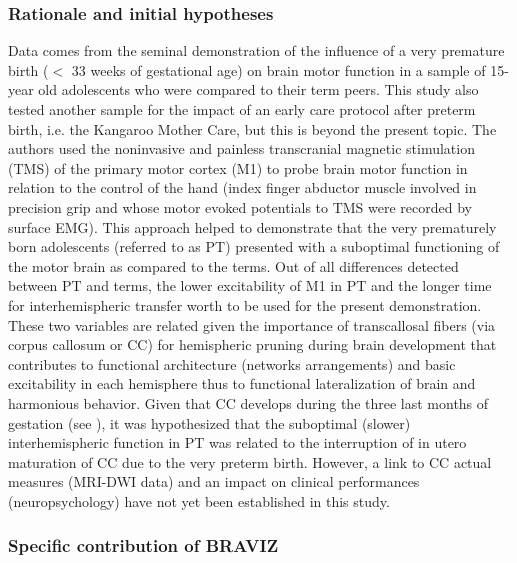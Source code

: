 \documentclass{frontiersHLTH}
\begin{document}
\subsubsection{Rationale and initial hypotheses}

Data comes from the seminal demonstration \cite{schneider_cerebral_2012} of the influence of a very premature birth ($<$ 33 weeks of gestational age) on brain motor function in a sample of 15-year old adolescents who were compared to their term peers. This study also tested another sample for the impact of an early care protocol after preterm birth, i.e. the Kangaroo Mother Care, but this is beyond the present topic. The authors used the noninvasive and painless transcranial magnetic stimulation (TMS) of the primary motor cortex (M1) to probe brain motor function in relation to the control of the hand (index finger abductor muscle involved in precision grip and whose motor evoked potentials to TMS were recorded by surface EMG). This approach helped to demonstrate that the very prematurely born adolescents (referred to as PT) presented with a suboptimal functioning of the motor brain as compared to the terms. Out of all differences detected between PT and terms, the lower excitability of M1 in PT and the longer time for interhemispheric transfer worth to be used for the present demonstration. These two variables are related given the importance of transcallosal fibers (via corpus callosum or CC) for hemispheric pruning during brain development that contributes to functional architecture (networks arrangements) and basic excitability in each hemisphere thus to functional lateralization of brain and harmonious behavior. Given that CC develops during the three last months of gestation (see \cite{schneider_cerebral_2012}), it was hypothesized that the suboptimal (slower) interhemispheric function in PT was related to the interruption of in utero maturation of CC due to the very preterm birth. However, a link to CC actual measures (MRI-DWI data) and an impact on clinical performances (neuropsychology) have not yet been established in this study.


\subsubsection{Specific contribution of BRAVIZ}
\end{document}
